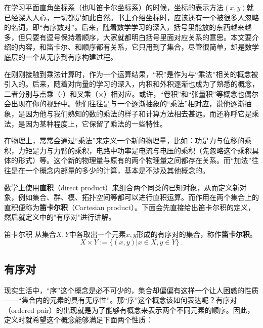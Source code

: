 

在学习平面直角坐标系（也叫笛卡尔坐标系）的时候，坐标的表示方法$(x,y)$就已经深入人心，一切都是如此自然。书上介绍坐标时，应该还有一个被很多人忽略的名词，即“有序数对”。后来，随着数学学习的深入，括号里能放的东西越来越多，但只要有逗号保持着顺序，大家就都明白括号里面对应关系的意思。本文要介绍的内容，和笛卡尔、和顺序都有关系，它只用到了集合，尽管很简单，却是数学底层的一个从无序到有序构建过程。

在刚刚接触到乘法计算时，作为一个运算结果，“积”是作为与“乘法”相关的概念被引入的。后来，随着对向量的学习的深入，内积和外积逐渐也成为了熟悉的概念，二者分别与点乘（$\cdot$）和叉乘（$\times$）相对应。或许，“卷积”和“张量积”等概念也偶尔会出现在你的视野中。他们往往是与一个逐渐抽象的“乘法”相对应，说他逐渐抽象，是因为他与我们熟知的数的乘法的样子和计算方法相去甚远。而还称呼它是乘法，是因为某种程度上，它保留了乘法的一些特性。

在物理上，常常会通过“乘法”来定义一个新的物理量，比如：功是力与位移的乘积，力矩是力与力臂的乘积，电路中功率是电流与电压的乘积（先忽略这个乘积具体的形式）等。这个新的物理量与原有的两个物理量之间都存在关系。而“加法”往往是在一个概念内部量的多少的计算，基本是不涉及其他概念的。

数学上使用\textbf{直积}（direct product）来组合两个同类的已知对象，从而定义新对象，例如集合、群、模、拓扑空间等都可以进行直积运算。而作用在两个集合上的直积便称为\textbf{笛卡尔积}（Cartesian product）。下面会先直接给出笛卡尔积的定义，然后就定义中的"有序对"进行讲解。

\begin{definition}{笛卡尔积}\label{def_CartPr_1}
从集合$X,Y$中各取出一个元素$x,y$形成的有序对的集合，称作\textbf{笛卡尔积}。
\begin{equation}
X\times Y:=\{(x,y)|x\in X,y\in Y\}~.
\end{equation}

\end{definition}

\subsection{有序对}

现实生活中，“序”这个概念是必不可少的，集合却偏偏有这样一个让人困惑的性质——“集合内的元素的具有无序性”。那“序”这个概念该如何表达呢？有序对（ordered pair）的出现就是为了能够有概念来表示两个不同元素的顺序。因此，定义时就希望这个概念能够满足下面两个性质：

